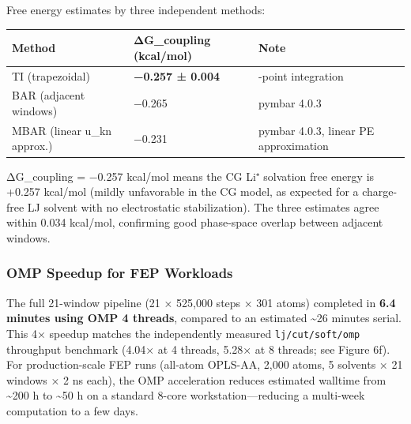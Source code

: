 \documentclass[
  11pt,
]{article}
\newcounter{none} %
\begin{document}
Free energy estimates by three independent methods:

{\def\LTcaptype{none} %
\begin{longtable}[]{@{}
  >{\raggedright\arraybackslash}p{}
  >{\raggedright\arraybackslash}p{}
  >{\raggedright\arraybackslash}p{}@{}}
\toprule\noalign{}
\begin{minipage}[b]{\linewidth}\raggedright
Method
\end{minipage} & \begin{minipage}[b]{\linewidth}\raggedright
ΔG\_coupling (kcal/mol)
\end{minipage} & \begin{minipage}[b]{\linewidth}\raggedright
Note
\end{minipage} \\
\midrule\noalign{}
\endhead
\bottomrule\noalign{}
\endlastfoot
TI (trapezoidal) & \textbf{−0.257 ± 0.004} & 21-point integration \\
BAR (adjacent windows) & −0.265 & pymbar 4.0.3 \\
MBAR (linear u\_kn approx.) & −0.231 & pymbar 4.0.3, linear PE
approximation \\
\end{longtable}
}

ΔG\_coupling = −0.257 kcal/mol means the CG Li⁺ solvation free energy is
+0.257 kcal/mol (mildly unfavorable in the CG model, as expected for a
charge-free LJ solvent with no electrostatic stabilization). The three
estimates agree within 0.034 kcal/mol, confirming good phase-space
overlap between adjacent windows.

\subsubsection{OMP Speedup for FEP
Workloads}\label{omp-speedup-for-fep-workloads}

The full 21-window pipeline (21 × 525,000 steps × 301 atoms) completed
in \textbf{6.4 minutes using OMP 4 threads}, compared to an estimated
\textasciitilde26 minutes serial. This 4× speedup matches the
independently measured \texttt{lj/cut/soft/omp} throughput benchmark
(4.04× at 4 threads, 5.28× at 8 threads; see Figure 6f). For
production-scale FEP runs (all-atom OPLS-AA, 2,000 atoms, 5 solvents ×
21 windows × 2 ns each), the OMP acceleration reduces estimated walltime
from \textasciitilde200 h to \textasciitilde50 h on a standard 8-core
workstation---reducing a multi-week computation to a few days.
\end{document}
